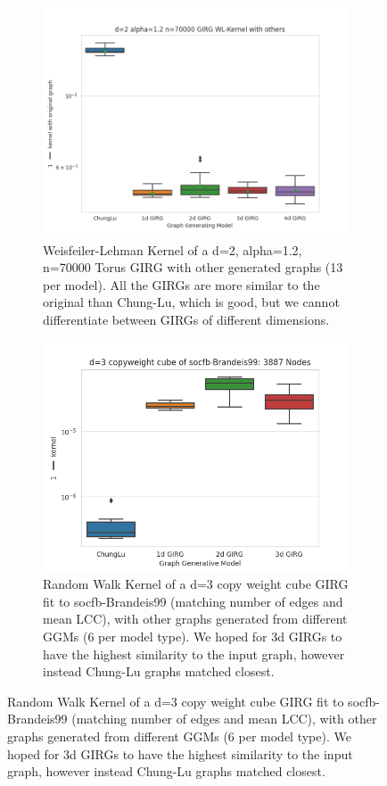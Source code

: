 \begin{figure}
  \centering

  \begin{subfigure}{0.49 \textwidth}
    \centering
    \includegraphics[width=\linewidth]{figures/d=2 alpha=1.2 n=70000 GIRG WL-Kernel with others.png}
    \caption{Weisfeiler-Lehman Kernel of a d=2, alpha=1.2, n=70000 Torus GIRG with other generated graphs (13 per model). All the GIRGs are more similar to the original than Chung-Lu, which is good, but we cannot differentiate between GIRGs of different dimensions.}
    \label{fig:wl_kernel_gentorus}
  \end{subfigure}
  \hfill
  \begin{subfigure}{0.49 \textwidth}
    \centering
    \includegraphics[width=\linewidth]{figures/socfb-Brandeis99 d=3.png}
    \caption{Random Walk Kernel of a d=3 copy weight cube GIRG fit to socfb-Brandeis99 (matching number of edges and mean LCC), with other graphs generated from different GGMs (6 per model type). We hoped for 3d GIRGs to have the highest similarity to the input graph, however instead Chung-Lu graphs matched closest.}
    \label{fig:rw_kernel_fitcopycube}
  \end{subfigure}
\end{figure}


